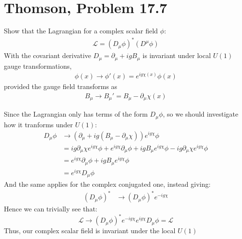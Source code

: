 \documentclass[12pt]{article}
\renewcommand{\L}{\mathcal{L}}
\newcommand{\D}{\partial}
\begin{document}
\section{Thomson, Problem 17.7}
\begin{problem}
  Show that the Lagrangian for a complex scalar field $\phi$:
  \begin{align*}
    \L=(D_\mu\phi)^*(D^\mu\phi)
  \end{align*}
  With the covariant derivative $D_\mu=\D_\mu+igB_\mu$ is invariant under local $U(1)$ gauge transformations,
  \begin{align*}
    \phi(x)\to\phi'(x)=e^{ig\chi(x)}\phi(x)
  \end{align*}
  provided the gauge field transforms as
  \begin{align*}
    B_\mu\to B_\mu'=B_\mu-\D_\mu\chi(x)
  \end{align*}
\end{problem}
Since the Lagrangian only has terms of the form $D_\mu\phi$, so we should investigate how it tranforms under $U(1)$:
\begin{align*}
  D_\mu\phi&\to(\D_\mu+ig(B_\mu-\D_\mu\chi))e^{ig\chi}\phi\\
  &=ig\D_\mu\chi e^{ig\chi}\phi+e^{ig\chi}\D_\mu\phi
  +igB_\mu e^{ig\chi}\phi-ig\D_\mu\chi e^{ig\chi}\phi\\
  &=e^{ig\chi}\D_\mu\phi+igB_\mu e^{ig\chi}\phi\\
  &=e^{ig\chi}D_\mu\phi
\end{align*}
And the same applies for the complex conjugated one, instead giving:
\begin{align*}
  (D_\mu\phi)^*&\to (D_\mu\phi)^*e^{-ig\chi}
\end{align*}
Hence we can trivially see that:
\begin{equation}
  \label{eq:p3}
  \boxed{\L\to(D_\mu\phi)^*e^{-ig\chi}e^{ig\chi}D_\mu\phi=\L}
\end{equation}
Thus, our complex scalar field is invariant under the local $U(1)$
\newpage
\end{document}
